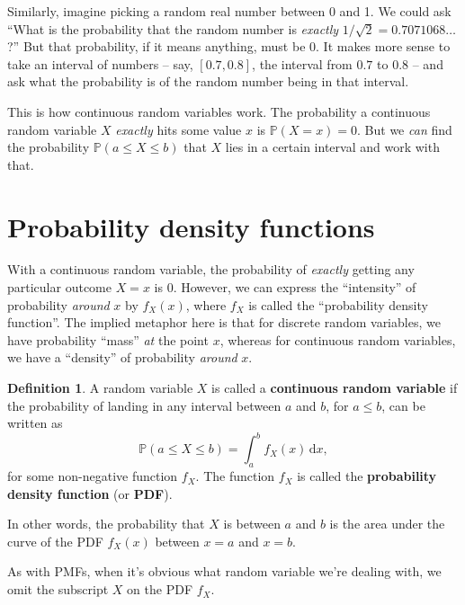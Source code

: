 \documentclass[
  a4paper,
]{book}
\theoremstyle{definition}
\newtheorem{definition}{Definition}[chapter]
\theoremstyle{definition}
\theoremstyle{definition}
\theoremstyle{definition}
\theoremstyle{remark}
\begin{document}
Similarly, imagine picking a random real number between 0 and 1. We could ask ``What is the probability that the random number is \emph{exactly} \(1/\sqrt{2} = 0.7071068\dots\)?'' But that probability, if it means anything, must be 0. It makes more sense to take an interval of numbers -- say, \([0.7, 0.8]\), the interval from \(0.7\) to \(0.8\) -- and ask what the probability is of the random number being in that interval.

This is how continuous random variables work. The probability a continuous random variable \(X\) \emph{exactly} hits some value \(x\) is \(\mathbb P(X = x) = 0\). But we \emph{can} find the probability \(\mathbb P(a \leq X \leq b)\) that \(X\) lies in a certain interval and work with that.

\hypertarget{pdf}{%
\section{Probability density functions}\label{pdf}}

With a continuous random variable, the probability of \emph{exactly} getting any particular outcome \(X = x\) is 0. However, we can express the ``intensity'' of probability \emph{around} \(x\) by \(f_X(x)\), where \(f_X\) is called the ``probability density function''. The implied metaphor here is that for discrete random variables, we have probability ``mass'' \emph{at} the point \(x\), whereas for continuous random variables, we have a ``density'' of probability \emph{around} \(x\).

\begin{definition}
A random variable \(X\) is called a \textbf{continuous random variable} if the probability of landing in any interval between \(a\) and \(b\), for \(a \leq b\), can be written as
\[ \mathbb P(a \leq X \leq b) = \int_a^b f_X(x) \, \mathrm{d}x , \]
for some non-negative function \(f_X\). The function \(f_X\) is called the \textbf{probability density function} (or \textbf{PDF}).
\end{definition}

In other words, the probability that \(X\) is between \(a\) and \(b\) is the area under the curve of the PDF \(f_X(x)\) between \(x = a\) and \(x = b\).

As with PMFs, when it's obvious what random variable we're dealing with, we omit the subscript \(X\) on the PDF \(f_X\).
\end{document}
